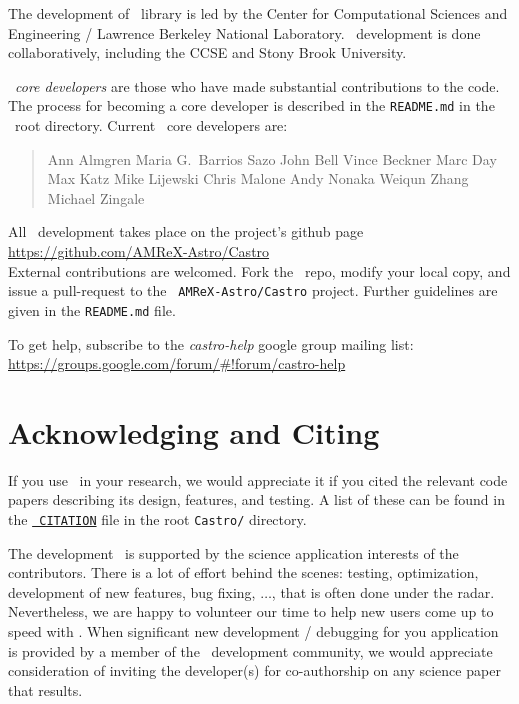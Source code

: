 The development of \amrex\ library is led by the
Center for Computational Sciences and Engineering / Lawrence Berkeley
National Laboratory.  \castro\ development is done collaboratively,
including the CCSE and Stony Brook University.

\castro\ {\em core developers} are those who have made substantial
contributions to the code.  The process for becoming a core developer
is described in the {\tt README.md} in the \castro\ root directory.
Current \castro\ core developers are:

\begin{quote}
Ann Almgren\newline
Maria G.\ Barrios Sazo\newline
John Bell\newline
Vince Beckner\newline
Marc Day\newline
Max Katz\newline
Mike Lijewski\newline
Chris Malone\newline
Andy Nonaka\newline
Weiqun Zhang\newline
Michael Zingale
\end{quote}

All \castro\ development takes place on the project's github
page\\[0.5em] \url{https://github.com/AMReX-Astro/Castro}\\[0.5em]
External contributions are welcomed.  Fork the \castro\ repo, modify
your local copy, and issue a pull-request to the {\tt
  AMReX-Astro/Castro} project.  Further guidelines are given in the
{\tt README.md} file.

To get help, subscribe to the {\em castro-help} google group mailing list:
\url{https://groups.google.com/forum/#!forum/castro-help}


\section*{Acknowledging and Citing \castro}

If you use \castro\ in your research, we would appreciate it if you
cited the relevant code papers describing its design, features, and
testing.  A list of these can be found in the
\href{https://github.com/AMReX-Astro/Castro/blob/master/CITATION}{\tt
  CITATION} file in the root {\tt Castro/} directory.

The development \castro\ is supported by the science application
interests of the contributors.  There is a lot of effort behind the
scenes: testing, optimization, development of new features, bug
fixing, $\ldots$, that is often done under the radar.  Nevertheless,
we are happy to volunteer our time to help new users come up to speed
with \castro.  When significant new development / debugging for you
application is provided by a member of the \castro\ development
community, we would appreciate consideration of inviting the
developer(s) for co-authorship on any science paper that results.
